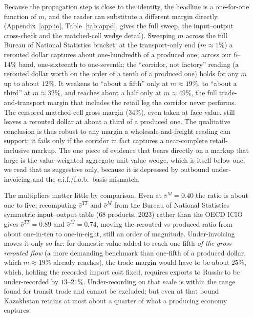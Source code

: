 \documentclass[12pt]{article}
\begin{document}
Because the propagation step is close to the identity, the headline is a one-for-one function
of $m$, and the reader can substitute a different margin directly (Appendix~\ref{app:io},
Table~\ref{tab:appd}, gives the full sweep, the input--output cross-check and the matched-cell
wedge detail).
Sweeping $m$ across the full
Bureau of National Statistics bracket: at the transport-only end ($m \approx 1\%$) a rerouted
dollar captures about one-hundredth of a produced one; across our 6--14\% band, one-sixteenth
to one-seventh; the ``corridor, not factory'' reading (a rerouted dollar worth on the order of
a tenth of a produced one) holds for any $m$ up to about $12\%$. It weakens to ``about a fifth''
only at $m \approx 19\%$, to ``about a third'' at $m \approx 32\%$, and reaches about a half
only at $m \approx 49\%$, the full trade-and-transport margin that includes the retail leg the
corridor never performs. The censored matched-cell gross margin ($34\%$), even taken at face value, still
leaves a rerouted dollar at about a third of a produced one. The qualitative conclusion is thus
robust to any margin a wholesale-and-freight reading can support; it fails only if the corridor
in fact captures a near-complete retail-inclusive markup. The one piece of evidence that bears
directly on a markup that large is the value-weighted aggregate unit-value wedge, which is
itself below one; we read that as suggestive only, because it is depressed by
outbound under-invoicing and the c.i.f./f.o.b.\ basis mismatch.

The multipliers matter little by comparison. Even at $\bar v^{M} = 0.40$ the ratio is about one
to five; recomputing $\bar v^{TT}$ and $\bar v^{M}$ from the Bureau of National Statistics
symmetric input--output table (68 products, 2023) rather than the OECD ICIO gives
$\bar v^{TT} = 0.89$ and $\bar v^{M} = 0.74$, moving the rerouted-vs-produced ratio from about
one-in-ten to one-in-eight, still an order of magnitude. Under-invoicing moves it only so far:
for domestic value added to reach one-fifth \emph{of the gross rerouted flow} (a more
demanding benchmark than one-fifth of a produced dollar, which $m \approx 19\%$ already
reaches), the trade margin would have to be about $25\%$, which, holding the recorded import cost fixed,
requires exports to Russia to be under-recorded by $13$--$21\%$. Under-recording on that scale is within the range found for
transit trade \citep{fisman2004missing} and cannot be excluded; but even at that bound
Kazakhstan retains at most about a quarter of what a producing economy captures.
\end{document}
